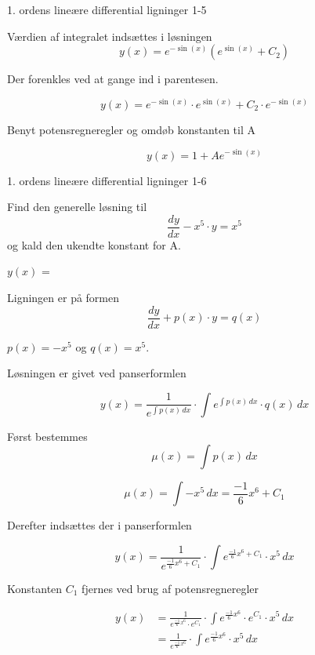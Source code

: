 \documentclass{article}
\begin{document}
\begin{exercise}{1. ordens lineære differential ligninger 1-5}
	\hint
	
	Værdien af integralet indsættes i løsningen
	\[
	y(x) = e^{- \sin(x)} \left( e^{\sin(x)}+ C_2\right)
	\]
	
	\hint
	
	Der forenkles ved at gange ind i parentesen.
	
	\hint
	\[
	y(x) = e^{- \sin(x)} \cdot e^{\sin(x)} + C_2 \cdot e^{- \sin(x)} 
	\]
	
	\hint
	
	Benyt potensregneregler og omdøb konstanten til A
	
	\hint
	\[
	y(x) = 1 + A e^{-\sin(x)}
	\]
	
	
\end{exercise}

\newpage

\begin{exercise}{1. ordens lineære differential ligninger 1-6}
	
	
	Find den generelle løsning til
	\[
	\frac{dy}{dx} - x^5 \cdot y = x^5
	\]
	og kald den ukendte konstant for A.
	
	$y(x)$ =   
	
	
	
	\hint
	
	Ligningen er på formen
	\[
	\frac{dy}{dx} + p(x) \cdot y = q(x)
	\]
	
	\hint
	
	$p(x)=-x^5$ og $q(x)=x^5$.
	
	\hint
	
	Løsningen er givet ved panserformlen
	
	
	\hint
	
	\[
	y(x) = \frac{1}{e^{\int p(x) \, dx}} \cdot \int e^{\int p(x) \, dx}  \cdot q(x) \, dx
	\]
	
	\hint
	
	Først bestemmes 
	\[
	\mu(x) = \int p(x) \, dx
	\]
	
	\hint
	\[
	\mu(x) = \int -x^5 \, dx = \frac{-1}{6} x^6 + C_1
	\]
	
	\hint
	Derefter indsættes der i  panserformlen
	
	\hint
	
	\[
	y(x) = \frac{1}{e^{\frac{-1}{6}x^6 + C_1}} \cdot \int e^{\frac{-1}{6}x^6 + C_1}  \cdot x^5 \, dx
	\]
	
	
	\hint
	
	Konstanten $C_1$ fjernes ved brug af potensregneregler
	
	\hint
	\begin{align*}
	y(x) &= \frac{1}{e^{\frac{-1}{6}x^6} \cdot e^{C_1}} \cdot \int e^{\frac{-1}{6}x^6} \cdot e^{C_1}  \cdot x^5 \, dx  \\
	&= \frac{1}{e^{\frac{-1}{6}x^6}} \cdot \int e^{\frac{-1}{6}x^6}  \cdot x^5 \, dx
	\end{align*}
	

\end{exercise}
\end{document}
